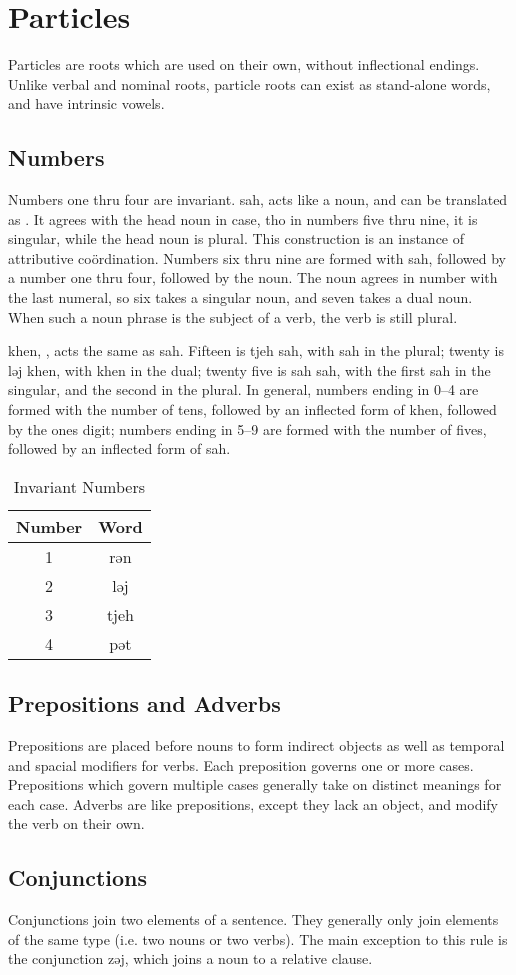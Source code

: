 \section{Particles}
Particles are roots which are used on their own, without inflectional endings.
Unlike verbal and nominal roots, particle roots can exist as stand-alone words,
and have intrinsic vowels.

\subsection{Numbers}
Numbers one thru four are invariant. {\ll sah}, acts like a noun, and can be
translated as . It agrees with the head noun in case, tho
in numbers five thru nine, it is singular, while the head noun is plural. This
construction is an instance of attributive coördination. Numbers six thru nine
are formed with {\ll sah}, followed by a number one thru four, followed by the
noun. The noun agrees in number with the last numeral, so six takes a singular
noun, and seven takes a dual noun. When such a noun phrase is the subject of a
verb, the verb is still plural.

{\ll khen}, , acts the same as {\ll sah}. Fifteen is {\ll
    tjeh sah}, with {\ll sah} in the plural; twenty is {\ll ləj khen}, with
{\ll khen} in the dual; twenty five is {\ll sah sah}, with the first {\ll sah}
in the singular, and the second in the plural. In general, numbers ending in
0--4 are formed with the number of tens, followed by an inflected form of {\ll
    khen}, followed by the ones digit; numbers ending in 5--9 are formed with
the number of fives, followed by an inflected form of {\ll sah}.

\begin{table}[h]
\centering
\caption{Invariant Numbers}
\label{tab:numbers}
\begin{tabular}{c>{\ll}c}
    \toprule
    Number & \rm Word \\ \midrule
    1  & rən \\
    2  & ləj \\
    3  & tjeh \\
    4  & pət \\
    \bottomrule
\end{tabular}
\end{table}

\subsection{Prepositions and Adverbs}
Prepositions are placed before nouns to form indirect objects as well as
temporal and spacial modifiers for verbs. Each preposition governs one or more
cases. Prepositions which govern multiple cases generally take on distinct
meanings for each case. Adverbs are like prepositions, except they lack an
object, and modify the verb on their own.

\subsection{Conjunctions}
Conjunctions join two elements of a sentence. They generally only join elements
of the same type (i.e. two nouns or two verbs). The main exception to this rule
is the conjunction {\ll zəj}, which joins a noun to a relative clause.

